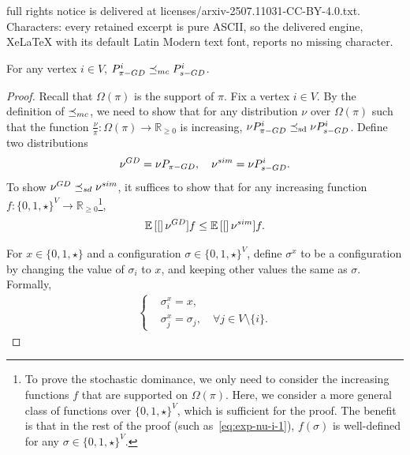 \documentclass[10pt,a4paper]{amsart}
\newcommand{\E}[1]{\mathbb{E}\left[{#1}\right]}
\newcommand{\mc}{\preceq_{\textnormal{mc}}}
\newcommand{\nug}{\nu^{\textnormal{GD}}}
\newcommand{\nus}{\nu^{\textnormal{sim}}}
\newcommand{\psim}{P_{\textnormal{s-GD}}}
\newcommand{\sd}{\preceq_{\textnormal{sd}}}
\begin{document}
full rights notice is delivered at licenses/arxiv-2507.11031-CC-BY-4.0.txt. Characters: every retained excerpt is pure ASCII, so the delivered engine, XeLaTeX with its default Latin Modern text font, reports no missing character.
\begin{lemma}\label{lem:phase-comparison-single-vertex}
For any vertex $i \in V$, $P^i_{\pi\textnormal{-GD}} \mc \psim^i$.
\end{lemma}

\begin{proof}
Recall that $\Omega(\pi)$ is the support of $\pi$.
Fix a vertex $i \in V$. 
By the definition of $\mc$, we need to show that for any distribution $\nu$ over $\Omega(\pi)$ such that the function $\frac{\nu}{\pi}:\Omega(\pi) \to \mathbb{R}_{\geq 0}$ is increasing, $\nu P^i_{\pi\textnormal{-GD}} \preceq_{\text{sd}} \nu \psim^i$. Define two distributions
\begin{align*}
\nug = \nu P_{\pi\textnormal{-GD}}, \quad \nus = \nu \psim^i.
\end{align*}
To show $\nug \sd \nus$, it suffices to show that for any increasing function $f:\{0,1,\star\}^V\to \mathbb{R}_{\geq 0}$\footnote{To prove the stochastic dominance, we only need to consider the increasing functions $f$ that are supported on $\Omega(\pi)$. Here, we consider a more general class of functions over $\{0,1,\star\}^V$, which is sufficient for the proof. The benefit is that in the rest of the proof (such as~\eqref{eq:exp-nu-i-1}), $f(\sigma)$ is well-defined for any $\sigma \in \{0,1,\star\}^V$.},
\begin{align}\label{eq:ineq-i-each}
    \E[\nug]{f}\leq \E[\nus]{f}.
\end{align}






For $x\in \{0,1,\star\}$ and a configuration $\sigma\in \{0,1,\star\}^V$, define $\sigma^x$ to be a configuration by changing the value of $\sigma_i$ to $x$, and keeping other values the same as $\sigma$. Formally,
\begin{align*}
    \begin{cases}
&\sigma^x_{i} = x,\\
&\sigma^x_j = \sigma_j,\quad \forall j\in V\setminus \{i\}.   
\end{cases}
\end{align*}






\end{proof}
\end{document}
